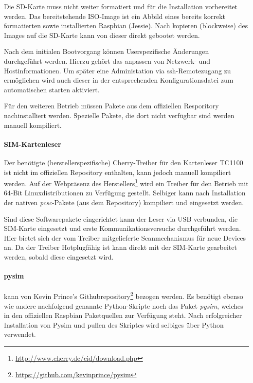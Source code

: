             Die SD-Karte muss nicht weiter formatiert und für die Installation vorbereitet werden. Das
            bereitstehende ISO-Image ist ein Abbild eines bereits korrekt formatierten sowie installierten
            Raspbian (Jessie). Nach kopieren (blockweise) des Images auf die SD-Karte kann von dieser direkt
            gebootet werden.

            Nach dem initialen Bootvorgang können Userspezifische Änderungen durchgeführt werden. Hierzu
            gehört das anpassen von Netzwerk- und Hostinformationen. Um später eine Administation via
            \ac{ssh}-Remotezugang zu ermöglichen wird auch dieser in der entsprechenden Konfigurationsdatei
            zum automatischen starten aktiviert.

            Für den weiteren Betrieb müssen Pakete aus dem offiziellen Resporitory
            nachinstalliert werden. Spezielle Pakete, die dort nicht verfügbar sind werden
            manuell kompiliert.

            \paragraph{SIM-Kartenleser} Der benötigte (herstellerspezifische)
            Cherry-Treiber für den Kartenleser TC1100 ist nicht im offiziellen Repository enthalten, kann jedoch
            manuell kompiliert werden. Auf der Webpräsenz des Herstellers\footnote{\url{http://www.cherry.de/cid/download.php}}
            wird ein Treiber für den Betrieb mit 64-Bit Linuxdistributionen zu Verfügung gestellt.
            Selbiger kann nach Installation der nativen \textit{pcsc}-Pakete (aus dem Repository)
            kompiliert und eingesetzt werden.

            Sind diese Softwarepakete eingerichtet kann der Leser via USB verbunden, die SIM-Karte eingesetzt
            und erste Kommunikationsversuche durchgeführt werden. Hier bietet sich der vom
            Treiber mitgelieferte Scanmechanismus für neue Devices an. Da der Treiber
            Hotplugfähig ist kann direkt mit der SIM-Karte gearbeitet werden, sobald diese
            eingesetzt wird.

			\paragraph{pysim} kann von Kevin Prince's Githubrepository\footnote{\url{https://github.com/kevinprince/pysim}} bezogen werden. Es benötigt ebenso
            wie andere nachfolgend genannte Python-Skripte noch das Paket \textit{pysim}, welches
            in den offiziellen Raspbian Paketquellen zur Verfügung steht. Nach erfolgreicher Installation
            von Pysim und pullen des Skriptes wird selbiges über Python verwendet.


